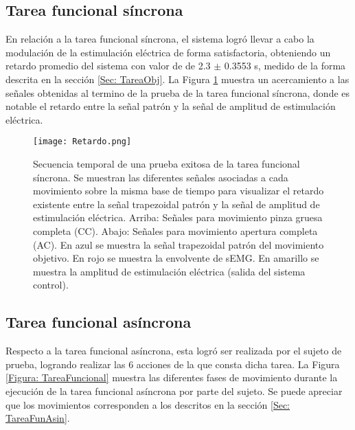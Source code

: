 \subsection{Tarea funcional síncrona}
En relación a la tarea funcional síncrona, el sistema logró llevar a cabo la modulación de la estimulación eléctrica de forma satisfactoria, obteniendo un retardo promedio del sistema con valor de de 2.3 $\pm$ 0.3553 s, medido de la forma descrita en la sección \ref{Sec: TareaObj}. La Figura \ref{Figura: Retardo} muestra un acercamiento a las señales obtenidas al termino de la prueba de la tarea funcional síncrona, donde es notable el retardo entre la señal patrón y la señal de amplitud de estimulación eléctrica.

\newpage
\begin{figure}[htbp]
	\centering
	\texttt{[image: Retardo.png]}
	\caption[Secuencia temporal de una prueba exitosa de la tarea funcional síncrona]{Secuencia temporal de una prueba exitosa de la tarea funcional síncrona. Se muestran las diferentes señales asociadas a cada movimiento sobre la misma base de tiempo para visualizar el retardo existente entre la señal trapezoidal patrón y la señal de amplitud de estimulación eléctrica. Arriba: Señales para movimiento pinza gruesa completa (CC). Abajo: Señales para movimiento apertura completa (AC). En azul se muestra la señal trapezoidal patrón del movimiento objetivo. En rojo se muestra la envolvente de sEMG. En amarillo se muestra la amplitud de estimulación eléctrica (salida del sistema control).}
	\label{Figura: Retardo}
\end{figure}


\subsection{Tarea funcional asíncrona}
Respecto a la tarea funcional asíncrona, esta logró ser realizada por el sujeto de prueba, logrando realizar las 6 acciones de la que consta dicha tarea. La Figura \ref{Figura: TareaFuncional} muestra las diferentes fases de movimiento durante la ejecución de la tarea funcional asíncrona por parte del sujeto. Se puede apreciar que los movimientos corresponden a los descritos en la sección \ref{Sec: TareaFunAsin}.

